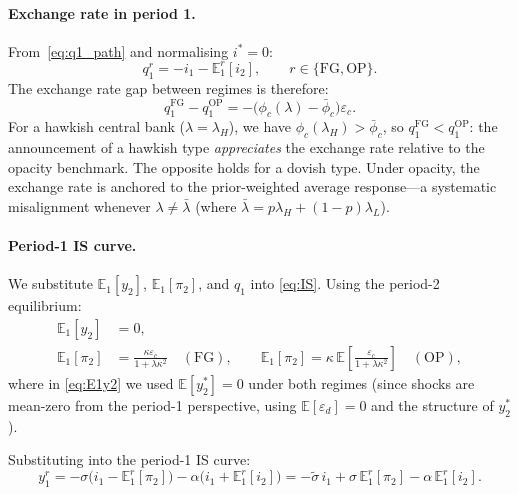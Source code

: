\paragraph{Exchange rate in period 1.}
From~\eqref{eq:q1_path} and normalising $i^* = 0$:
\begin{equation}
  q_1^r = -i_1 - \mathbb{E}_1^r[i_2], \qquad r \in \{\mathrm{FG}, \mathrm{OP}\}.
  \label{eq:q1_regime}
\end{equation}
The exchange rate gap between regimes is therefore:
\begin{equation}
  q_1^{\mathrm{FG}} - q_1^{\mathrm{OP}}
    = -\bigl(\phi_c(\lambda) - \bar{\phi}_c\bigr)\varepsilon_c.
  \label{eq:q1_gap}
\end{equation}
For a hawkish central bank ($\lambda = \lambda_H$), we have $\phi_c(\lambda_H) >
\bar{\phi}_c$, so $q_1^{\mathrm{FG}} < q_1^{\mathrm{OP}}$: the announcement of a
hawkish type \emph{appreciates} the exchange rate relative to the opacity benchmark.
The opposite holds for a dovish type. Under opacity, the exchange rate is anchored to
the prior-weighted average response---a systematic misalignment whenever $\lambda \neq
\bar{\lambda}$ (where $\bar{\lambda} = p\lambda_H + (1-p)\lambda_L$).

\paragraph{Period-1 IS curve.}
We substitute $\mathbb{E}_1[y_2]$, $\mathbb{E}_1[\pi_2]$, and $q_1$ into
\eqref{eq:IS}. Using the period-2 equilibrium:
\begin{align}
  \mathbb{E}_1[y_2]  &= 0, \label{eq:E1y2}\\
  \mathbb{E}_1[\pi_2] &= \frac{\kappa\varepsilon_c}{1+\lambda\kappa^2}
    \quad (\text{FG}), \qquad
    \mathbb{E}_1[\pi_2] = \kappa\,\mathbb{E}\!\left[
      \frac{\varepsilon_c}{1+\lambda\kappa^2}\right]
    \quad (\text{OP}),
  \label{eq:E1pi2}
\end{align}
where in \eqref{eq:E1y2} we used $\mathbb{E}[y_2^*] = 0$ under both regimes (since
shocks are mean-zero from the period-1 perspective, using $\mathbb{E}[\varepsilon_d] = 0$
and the structure of $y_2^*$).

Substituting into the period-1 IS curve:
\begin{equation}
  y_1^r = -\sigma\bigl(i_1 - \mathbb{E}_1^r[\pi_2]\bigr)
           -\alpha\bigl(i_1 + \mathbb{E}_1^r[i_2]\bigr)
         = -\tilde{\sigma}\,i_1
           + \sigma\,\mathbb{E}_1^r[\pi_2]
           - \alpha\,\mathbb{E}_1^r[i_2].
  \label{eq:IS1_reduced}
\end{equation}

